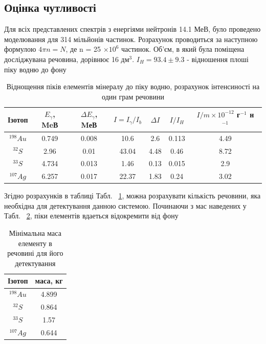 \documentclass[a4paper, 14pt]{article}
\numberwithin{equation}{section}
\numberwithin{table}{section}
\begin{document}
\subsection{Оцінка чутливості}
Для всіх представлених спектрів з енергіями нейтронів 14.1 МеВ, було проведено моделювання для 314 мільйонів частинок. Розрахунок проводиться за наступною формулою $ 4 \pi n = N$, де n = 25 $\times 10^6$ частинок. 
Об'єм, в який була поміщена досліджувана речовина, дорівнює 16 дм$^3$.
$I_H = 93.4 \pm 9.3$ - відношення плоші піку водню до фону
\begin{table}[h]
	\centering
	\caption{Віднощення піків елементів мінералу до піку водню, розрахунок інтенсиності на один грам речовини} 
	\begin{tabular}{|c|c|c|c|c|c|c|} 
		\hline
		Ізотоп & $E_{\gamma}$, MeВ & $\Delta{E_{\gamma}}$, MеВ &  $I = I_{\gamma} / I_{b}$ & $\Delta{I}$ & $I / I_H$ & $I / m \times 10 ^{-12}$ г$^{-1}$ н $^{-1}$ \\
		\hline
		$^{198}Au$&0.749 & 0.008 & 10.6 & 2.6 & 0.113 & 4.49\\
		\hline
		$^{32}S$&2.96 & 0.01 & 43.04 & 4.48 & 0.46 & 8.72\\	
		\hline
		$^{33}S$&4.734 & 0.013 & 1.46 & 0.13 & 0.015 & 2.9\\	
		\hline
		$^{107}Ag$& 6.257 & 0.017 & 22.37 & 1.83 & 0.24 & 3.02\\
		\hline
	\end{tabular}
	\label{tabl:IntensSens}
\end{table}

Згідно розрахунків в таблиці Табл. ~\ref{tabl:IntensSens}, можна розрахувати кількість речовини, яка необхідна для детектування данною системою. Починаючи з мас наведених у Табл. ~\ref{tabl:mass}, піки елементів вдаеться відокремити від фону
\begin{table}[h]
	\centering
	\caption{Мінімальна маса елементу в речовині для його детектування} 
	\begin{tabular}{|c|c|} 
		\hline
		Ізотоп & маса, кг \\
		\hline
		$^{198}Au$& 4.899 \\
		\hline
		$^{32}S$& 0.864 \\	
		\hline
		$^{33}S$& 1.57\\	
		\hline
		$^{107}Ag$& 0.644 \\
		\hline
	\end{tabular}
	\label{tabl:mass}
\end{table}
\newpage 
\end{document}
